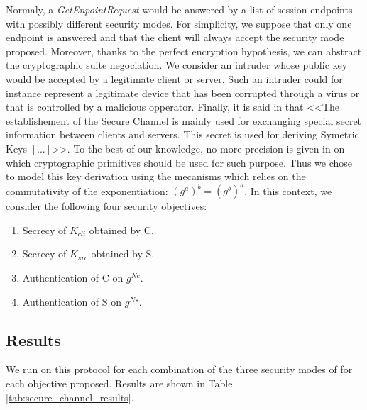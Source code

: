 Normaly, a {\em GetEnpointRequest} would be answered by a list of
session endpoints with possibly different security modes.  For
simplicity, we suppose that only one endpoint is answered and that the
client will always accept the security mode proposed.  Moreover,
thanks to the perfect encryption hypothesis, we can abstract the
cryptographic suite negociation.  We consider an intruder whose public
key would be accepted by a legitimate client or server.  Such an
intruder could for instance represent a legitimate device that has
been corrupted through a virus or that is controlled by a malicious
opperator.  Finally, it is said in \cite{MLD09} that <<The
establishement of the Secure Channel is mainly used for exchanging
special secret information between clients and servers. This secret is
used for deriving Symetric Keys $[...]$>>.  To the best of our
knowledge, no more precision is given in
\cite{MLD09,opcua_part2,opcua_part4,opcua_part6} on which
cryptographic primitives should be used for such purpose.  Thus we
chose to model this key derivation using the \DiH mecanisms which
relies on the commutativity of the exponentiation: $(g^a)^b =
(g^b)^a$.  In this context, we consider the following four security
objectives:
\begin{enumerate}
    \item\label{item:sc_sec_cli} Secrecy of $K_{cli}$ obtained by C.
    \item\label{item:sc_sec_srv} Secrecy of $K_{src}$ obtained by S.
    \item\label{item:sc_auth_cli} Authentication of C on $g^{Nc}$.
    \item\label{item:sc_auth_srv} Authentication of S on $g^{Ns}$.
\end{enumerate}

\subsection{Results}\label{sec:secure_channel_res}

We run \proverif on this protocol for each combination of the three security
modes of \opcua for each objective proposed.
Results are shown in Table \ref{tab:secure_channel_results}.

